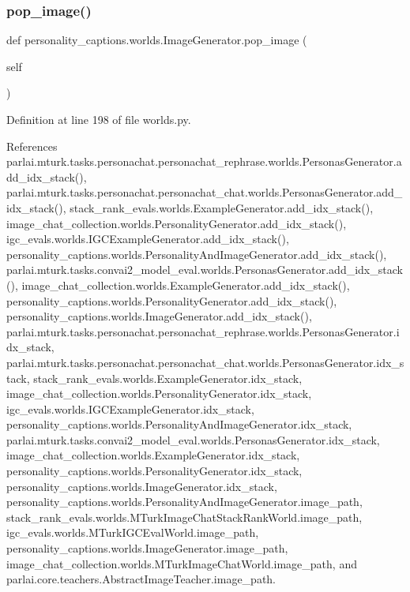 \subsubsection{\texorpdfstring{pop\+\_\+image()}{pop\_image()}}
{\footnotesize\ttfamily def personality\+\_\+captions.\+worlds.\+Image\+Generator.\+pop\+\_\+image (\begin{DoxyParamCaption}\item[{}]{self }\end{DoxyParamCaption})}



Definition at line 198 of file worlds.\+py.



References parlai.\+mturk.\+tasks.\+personachat.\+personachat\+\_\+rephrase.\+worlds.\+Personas\+Generator.\+add\+\_\+idx\+\_\+stack(), parlai.\+mturk.\+tasks.\+personachat.\+personachat\+\_\+chat.\+worlds.\+Personas\+Generator.\+add\+\_\+idx\+\_\+stack(), stack\+\_\+rank\+\_\+evals.\+worlds.\+Example\+Generator.\+add\+\_\+idx\+\_\+stack(), image\+\_\+chat\+\_\+collection.\+worlds.\+Personality\+Generator.\+add\+\_\+idx\+\_\+stack(), igc\+\_\+evals.\+worlds.\+I\+G\+C\+Example\+Generator.\+add\+\_\+idx\+\_\+stack(), personality\+\_\+captions.\+worlds.\+Personality\+And\+Image\+Generator.\+add\+\_\+idx\+\_\+stack(), parlai.\+mturk.\+tasks.\+convai2\+\_\+model\+\_\+eval.\+worlds.\+Personas\+Generator.\+add\+\_\+idx\+\_\+stack(), image\+\_\+chat\+\_\+collection.\+worlds.\+Example\+Generator.\+add\+\_\+idx\+\_\+stack(), personality\+\_\+captions.\+worlds.\+Personality\+Generator.\+add\+\_\+idx\+\_\+stack(), personality\+\_\+captions.\+worlds.\+Image\+Generator.\+add\+\_\+idx\+\_\+stack(), parlai.\+mturk.\+tasks.\+personachat.\+personachat\+\_\+rephrase.\+worlds.\+Personas\+Generator.\+idx\+\_\+stack, parlai.\+mturk.\+tasks.\+personachat.\+personachat\+\_\+chat.\+worlds.\+Personas\+Generator.\+idx\+\_\+stack, stack\+\_\+rank\+\_\+evals.\+worlds.\+Example\+Generator.\+idx\+\_\+stack, image\+\_\+chat\+\_\+collection.\+worlds.\+Personality\+Generator.\+idx\+\_\+stack, igc\+\_\+evals.\+worlds.\+I\+G\+C\+Example\+Generator.\+idx\+\_\+stack, personality\+\_\+captions.\+worlds.\+Personality\+And\+Image\+Generator.\+idx\+\_\+stack, parlai.\+mturk.\+tasks.\+convai2\+\_\+model\+\_\+eval.\+worlds.\+Personas\+Generator.\+idx\+\_\+stack, image\+\_\+chat\+\_\+collection.\+worlds.\+Example\+Generator.\+idx\+\_\+stack, personality\+\_\+captions.\+worlds.\+Personality\+Generator.\+idx\+\_\+stack, personality\+\_\+captions.\+worlds.\+Image\+Generator.\+idx\+\_\+stack, personality\+\_\+captions.\+worlds.\+Personality\+And\+Image\+Generator.\+image\+\_\+path, stack\+\_\+rank\+\_\+evals.\+worlds.\+M\+Turk\+Image\+Chat\+Stack\+Rank\+World.\+image\+\_\+path, igc\+\_\+evals.\+worlds.\+M\+Turk\+I\+G\+C\+Eval\+World.\+image\+\_\+path, personality\+\_\+captions.\+worlds.\+Image\+Generator.\+image\+\_\+path, image\+\_\+chat\+\_\+collection.\+worlds.\+M\+Turk\+Image\+Chat\+World.\+image\+\_\+path, and parlai.\+core.\+teachers.\+Abstract\+Image\+Teacher.\+image\+\_\+path.

